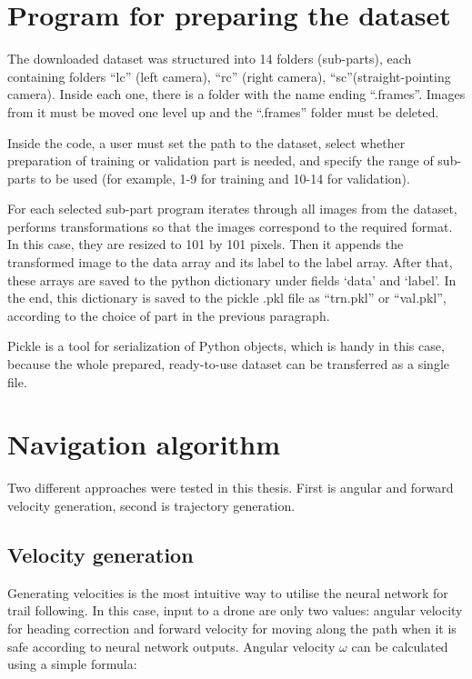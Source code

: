 \section{Program for preparing the dataset}

The downloaded dataset was structured into 14 folders (sub-parts), each containing folders “lc” (left camera), “rc” (right camera), “sc”(straight-pointing camera). Inside each one, there is a folder with the name ending “.frames”. Images from it must be moved one level up and the “.frames” folder must be deleted. 

Inside the code, a user must set the path to the dataset, select whether preparation of training or validation part is needed, and specify the range of sub-parts to be used (for example, 1-9 for training and 10-14 for validation).

For each selected sub-part program iterates through all images from the dataset, performs transformations so that the images correspond to the required format. In this case, they are resized to 101 by 101 pixels. Then it appends the transformed image to the data array and its label to the label array. After that, these arrays are saved to the python dictionary under fields ‘data’ and ‘label’. In the end, this dictionary is saved to the pickle .pkl file as “trn.pkl” or “val.pkl”, according to the choice of part in the previous paragraph.

Pickle is a tool for serialization of Python objects, which is handy in this case, because the whole prepared, ready-to-use dataset can be transferred as a single file.

\section{Navigation algorithm}

Two different approaches were tested in this thesis. First is angular and forward velocity generation, second is trajectory generation. 

\subsection{Velocity generation}

Generating velocities is the most intuitive way to utilise the neural network for trail following. In this case, input to a drone are only two values: angular velocity for heading correction and forward velocity for moving along the path when it is safe according to neural network outputs. Angular velocity $\omega$ can be calculated using a simple formula:

